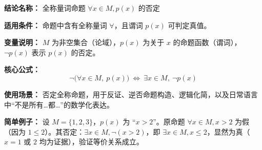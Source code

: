 \textbf{结论名称：} 全称量词命题 $\forall x\in M, p(x)$ 的否定

\textbf{适用条件：} 命题中含有全称量词 $\forall$，且谓词 $p(x)$ 可判定真值。

\textbf{变量说明：} $M$ 为非空集合（论域），$p(x)$ 为关于 $x$ 的命题函数（谓词），$\neg p(x)$ 表示 $p(x)$ 的否定。

\textbf{核心公式：}
\[
\boxed{\neg \big( \forall x \in M, \ p(x) \big) \ \iff \ \exists x \in M, \ \neg p(x)}
\]

\textbf{使用场景：} 否定全称命题，用于反证、逆否命题构造、逻辑化简，以及日常语言中“不是所有…都…”的数学化表达。

\textbf{简单例子：} 设 $M = \{1,2,3\}$，$p(x)$ 为 “$x > 2$”。原命题 $\forall x\in M, x>2$ 为假（因为 $1\le 2$）。其否定：$\exists x\in M, \neg(x>2)$，即 $\exists x\in M, x\le 2$，显然为真（$x=1$ 或 $2$ 均为证据），验证等价关系成立。